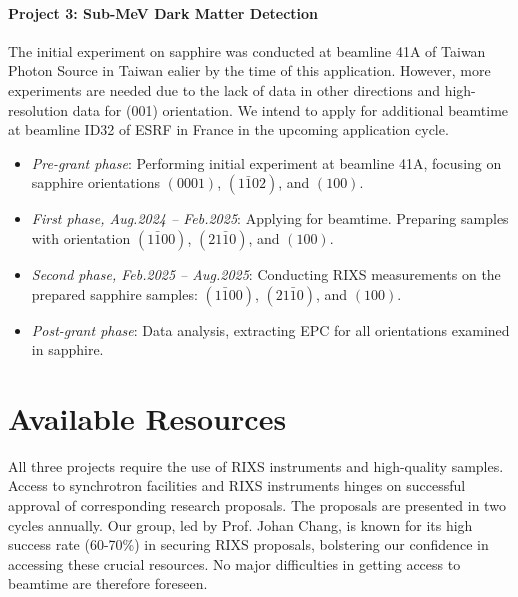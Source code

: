 \documentclass[11pt]{article}
\begin{document}
\paragraph{Project 3: Sub-MeV Dark Matter Detection}
The initial experiment on sapphire was conducted at beamline 41A of Taiwan Photon Source in Taiwan ealier by the time of this application. However, more experiments are needed due to the lack of data in other directions and high-resolution data for (001) orientation. We intend to apply for additional beamtime at beamline ID32 of ESRF in France in the upcoming application cycle.
\begin{itemize}
  \item \textit{Pre-grant phase}: Performing initial experiment at beamline 41A, focusing on sapphire orientations $(0001)$, $(1\bar{1}02)$, and $(100)$. 
  \item \textit{First phase, Aug.2024 -- Feb.2025}: Applying for beamtime. Preparing samples with orientation $(1\bar{1}00)$, $(21\bar{1}0)$, and $(100)$. 
  \item \textit{Second phase, Feb.2025 -- Aug.2025}: Conducting RIXS measurements on the prepared sapphire samples: $(1\bar{1}00)$, $(21\bar{1}0)$, and $(100)$. 
  \item \textit{Post-grant phase}: Data analysis, extracting EPC for all orientations examined in sapphire.
\end{itemize}

\section{Available Resources}
All three projects require the use of RIXS instruments and high-quality samples. Access to synchrotron facilities and RIXS instruments hinges on successful approval of corresponding research proposals. The proposals are presented in two cycles annually. Our group, led by Prof. Johan Chang, is known for its high success rate (60-70\%) in securing RIXS proposals, bolstering our confidence in accessing these crucial resources. No major difficulties in getting access to beamtime are therefore foreseen. 
\end{document}
